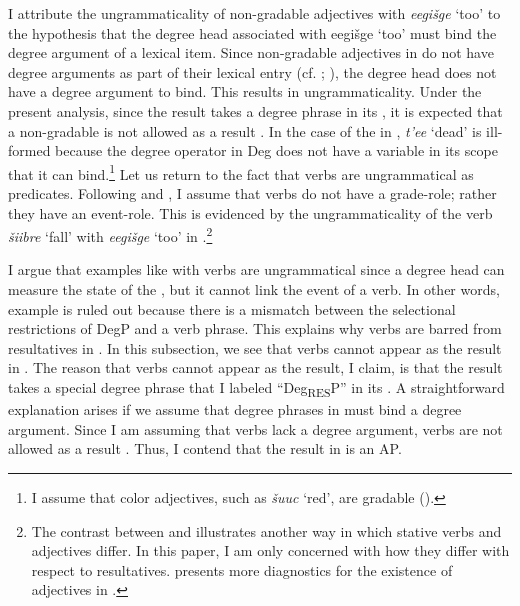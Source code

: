 \documentclass[output=paper]{LSP/langsci}
\begin{document}
I attribute the ungrammaticality of non-gradable adjectives with \textit{eegišge} `too' to the hypothesis that the degree head associated with eegišge `too' must bind the degree argument of a lexical item. Since non-gradable adjectives in  do not have degree arguments as part of their lexical entry (cf. \citealt{Higginbotham1985}; \citealt{Corver1997}), the degree head does not have a degree argument to bind. This results in ungrammaticality. Under the present analysis, since the result takes a degree phrase in its , it is expected that a non-gradable  is not allowed as a result . In the case of the  in , \textit{t'ee} `dead' is ill-formed because the degree operator in Deg does not have a variable in its scope that it can bind.\footnote{I assume that color adjectives, such as \textit{šuuc} `red', are gradable (\citealt{KennedyMcNally2010}).} Let us return to the fact that verbs are ungrammatical as  predicates. Following \citet{Higginbotham1985} and \citet{Corver1997}, I assume that verbs do not have a grade-role; rather they have an event-role. This is evidenced by the ungrammaticality of the verb \textit{šiibre} `fall' with \textit{eegišge} `too' in .\footnote{The contrast between  and  illustrates another way in which stative verbs and adjectives differ. In this paper, I am only concerned with how they differ with respect to resultatives. \citet{Rosen2014,Rosen2015} presents more diagnostics for the existence of adjectives in .}

\begin{exe}


\end{exe}

I argue that  examples like  with verbs are ungrammatical since a degree head can measure the state of the , but it cannot link the event of a verb. In other words, example  is ruled out because there is a mismatch between the selectional restrictions of DegP and a verb phrase. This explains why verbs are barred from resultatives in . In this subsection, we see that verbs cannot appear as the result  in . The reason that verbs cannot appear as the result, I claim, is that the result  takes a special degree phrase that I labeled ``Deg\textsubscript{RES}P'' in its . A straightforward explanation arises if we assume that degree phrases in  must bind a degree argument. Since I am assuming that verbs lack a degree argument, verbs are not allowed as a result . Thus, I contend that the result  in  is an AP.
\end{document}

